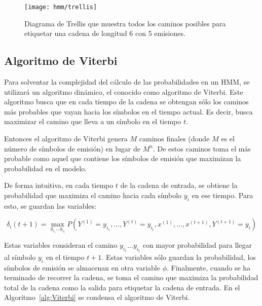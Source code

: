\begin{figure}
    \centering
    \texttt{[image: hmm/trellis]}
    \caption{Diagrama de Trellis que muestra todos los caminos posibles para etiquetar una cadena de longitud 6 con 5 emisiones.}
    \label{Fig:Trellis}
\end{figure}

\subsection{Algoritmo de Viterbi}

Para solventar la complejidad del cálculo de las probabilidades en un HMM, se utilizará un algoritmo dinámico, el conocido como algoritmo de Viterbi. Este algoritmo busca que en cada tiempo de la cadena se obtengan sólo los caminos más probables que vayan hacia los símbolos en el tiempo actual. Es decir, busca maximizar el camino que lleva a un símbolo en el tiempo $t$.

Entonces el algoritmo de Viterbi genera $M$ caminos finales (donde $M$ es el número de símbolos de emisión) en lugar de $M^n$. De estos caminos toma el más probable como aquel que contiene los símbolos de emisión que maximizan la probabilidad en el modelo.

De forma intuitiva, en cada tiempo $t$ de la cadena de entrada, se obtiene la probabilidad que maximiza el camino hacia cada símbolo $y_i$ en ese tiempo. Para esto, se guardan las variables:

\begin{equation*}
\delta_i(t+1) = \max_{y_{i_1}...y_{i_t}} P(Y^{(1)}=y_{i_1}, ...,Y^{(t)}=y_{i_t}, x^{(1)},...,x^{(t+1)}, Y^{(t+1)}=y_i)
\end{equation*}

Estas variables consideran el camino $y_{i_1}...y_{i_t}$ con mayor probabilidad para llegar al símbolo $y_i$ en el tiempo $t+1$. Estas variables sólo guardan la probabilidad, los símbolos de emisión se almacenan en otra variable $\phi$. Finalmente, cuando se ha terminado de recorrer la cadena, se toma el camino que maximiza la probabilidad total de la cadena como la salida para etiquetar la cadena de entrada. En el Algoritmo~\ref{alg:Viterbi} se condensa el algoritmo de Viterbi.



